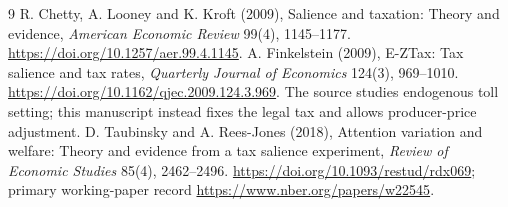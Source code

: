 \documentclass[11pt]{article}
\theoremstyle{remark}\newtheorem{remark}[theorem]{Remark}
\begin{document}
\begin{thebibliography}{9}
 R. Chetty, A. Looney and K. Kroft (2009), Salience and taxation: Theory and evidence, \emph{American Economic Review} 99(4), 1145--1177. \url{https://doi.org/10.1257/aer.99.4.1145}.
 A. Finkelstein (2009), E-ZTax: Tax salience and tax rates, \emph{Quarterly Journal of Economics} 124(3), 969--1010. \url{https://doi.org/10.1162/qjec.2009.124.3.969}. The source studies endogenous toll setting; this manuscript instead fixes the legal tax and allows producer-price adjustment.
 D. Taubinsky and A. Rees-Jones (2018), Attention variation and welfare: Theory and evidence from a tax salience experiment, \emph{Review of Economic Studies} 85(4), 2462--2496. \url{https://doi.org/10.1093/restud/rdx069}; primary working-paper record \url{https://www.nber.org/papers/w22545}.
\end{thebibliography}
\end{document}
